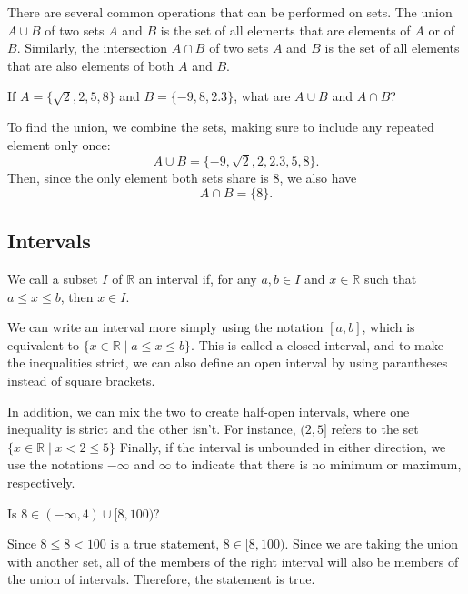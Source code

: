 \noindent
There are several common operations that can be performed on sets.
The union $A \cup B$ of two sets $A$ and $B$ is the set of all elements that are elements of $A$ or of $B$. 
Similarly, the intersection $A \cap B$ of two sets $A$ and $B$ is the set of all elements that are also elements of both $A$ and $B$.
\begin{example}
	If $A = \{\sqrt{2}, 2, 5, 8\}$ and $B = \{-9, 8, 2.3\}$, what are $A \cup B$ and $A \cap B$?		
\end{example}
To find the union, we combine the sets, making sure to include any repeated element only once:
\begin{equation*}
	A \cup B = \{-9, \sqrt{2}, 2, 2.3, 5, 8\}.
\end{equation*}
Then, since the only element both sets share is 8, we also have
\begin{equation*}
	A \cap B = \{8\}.
\end{equation*}

\subsection{Intervals}
\begin{definition}
	We call a subset $I$ of $\mathbb{R}$ an interval if, for any $a, b \in I$ and $x \in \mathbb{R}$ such that $a \leq x \leq b$, then $x \in I$. 
\end{definition}
We can write an interval more simply using the notation $[a, b]$, which is equivalent to $\{x \in \mathbb{R} \mid a \leq x \leq b\}$. 
This is called a closed interval, and to make the inequalities strict, we can also define an open interval by using parantheses instead of square brackets.\bigskip

In addition, we can mix the two to create half-open intervals, where one inequality is strict and the other isn't. 
For instance, $(2, 5]$ refers to the set $\{x \in \mathbb{R} \mid x < 2 \leq 5\}$
Finally, if the interval is unbounded in either direction, we use the notations $-\infty$ and $\infty$ to indicate that there is no minimum or maximum, respectively.

\begin{example}
	Is $8 \in (-\infty, 4) \cup [8, 100)$?
\end{example}
\begin{answer}
	Since $8 \leq 8 < 100$ is a true statement, $8 \in [8, 100)$. 
	Since we are taking the union with another set, all of the members of the right interval will also be members of the union of intervals. 
	Therefore, the statement is true.
\end{answer}